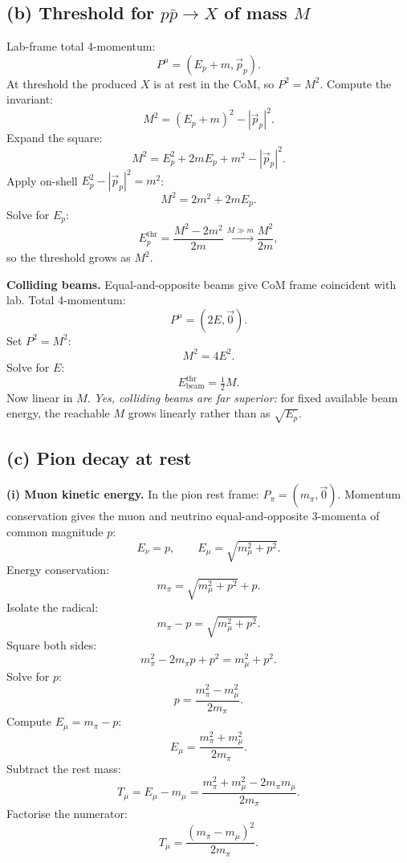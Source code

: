 \documentclass[11pt]{article}
\begin{document}
\subsection*{(b) Threshold for $p\bar p\to X$ of mass $M$}

Lab-frame total 4-momentum:
\[ P^{\mu}=(E_{p}+m,\vec p_{p}). \]
At threshold the produced $X$ is at rest in the CoM, so $P^{2}=M^{2}$. Compute the invariant:
\[ M^{2}=(E_{p}+m)^{2}-|\vec p_{p}|^{2}. \]
Expand the square:
\[ M^{2}=E_{p}^{2}+2mE_{p}+m^{2}-|\vec p_{p}|^{2}. \]
Apply on-shell $E_{p}^{2}-|\vec p_{p}|^{2}=m^{2}$:
\[ M^{2}=2m^{2}+2mE_{p}. \]
Solve for $E_{p}$:
\begin{equation}
\boxed{\;E_{p}^{\text{thr}}=\frac{M^{2}-2m^{2}}{2m}\xrightarrow{M\gg m}\frac{M^{2}}{2m},\;}
\end{equation}
so the threshold grows as $M^{2}$.

\textbf{Colliding beams.} Equal-and-opposite beams give CoM frame coincident with lab. Total 4-momentum:
\[ P^{\mu}=(2E,\vec 0). \]
Set $P^{2}=M^{2}$:
\[ M^{2}=4E^{2}. \]
Solve for $E$:
\begin{equation}
\boxed{\;E_{\text{beam}}^{\text{thr}}=\tfrac{1}{2}M.\;}
\end{equation}
Now linear in $M$. \emph{Yes, colliding beams are far superior:} for fixed available beam energy, the reachable $M$ grows linearly rather than as $\sqrt{E_{p}}$.

\subsection*{(c) Pion decay at rest}

\textbf{(i) Muon kinetic energy.} In the pion rest frame: $P_{\pi}=(m_{\pi},\vec 0)$. Momentum conservation gives the muon and neutrino equal-and-opposite 3-momenta of common magnitude $p$:
\[ E_{\nu}=p,\qquad E_{\mu}=\sqrt{m_{\mu}^{2}+p^{2}}. \]
Energy conservation:
\[ m_{\pi}=\sqrt{m_{\mu}^{2}+p^{2}}+p. \]
Isolate the radical:
\[ m_{\pi}-p=\sqrt{m_{\mu}^{2}+p^{2}}. \]
Square both sides:
\[ m_{\pi}^{2}-2m_{\pi}p+p^{2}=m_{\mu}^{2}+p^{2}. \]
Solve for $p$:
\[ p=\frac{m_{\pi}^{2}-m_{\mu}^{2}}{2m_{\pi}}. \]
Compute $E_{\mu}=m_{\pi}-p$:
\[ E_{\mu}=\frac{m_{\pi}^{2}+m_{\mu}^{2}}{2m_{\pi}}. \]
Subtract the rest mass:
\[ T_{\mu}=E_{\mu}-m_{\mu}=\frac{m_{\pi}^{2}+m_{\mu}^{2}-2m_{\pi}m_{\mu}}{2m_{\pi}}. \]
Factorise the numerator:
\begin{equation}
\boxed{\;T_{\mu}=\frac{(m_{\pi}-m_{\mu})^{2}}{2m_{\pi}}.\;}
\end{equation}
\end{document}
